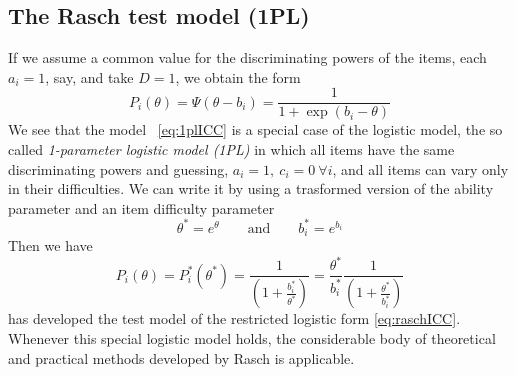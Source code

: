 \subsection{The Rasch test model (1PL)}
If we assume a common value for the discriminating powers of the items, each $a_i = 1$, say, and take $D = 1$, we obtain the form
\begin{equation} \label{eq:1plICC}
P_i(\theta)=\Psi(\theta-b_i)=\frac{1}{1+\exp(b_i-\theta)} 
\end{equation}
 We see that the model ~\ref{eq:1plICC} is a special case of the logistic model, the so called \textit{1-parameter logistic model (1PL)} in which all items have the same discriminating powers and guessing, $a_i=1, \ c_i=0 \ \forall i$, and all items can vary only in their difficulties.
We can write it by using a trasformed version of the ability parameter and an item difficulty parameter
\begin{equation}
\theta^{*}=e^\theta \qquad \text{and} \qquad b^{*}_i=e^{b_i }
\end{equation}
Then we have
\begin{equation}\label{eq:raschICC}
P_i(\theta)=P_i^*(\theta^*)=\frac{1}{\left( 1+ \frac{b_i^*}{\theta^*}\right)}=\frac{\theta^*}{b_i^*}\frac{1}{\left( 1+ \frac{\theta^*}{b_i^*} \right)} 
\end{equation}
\cite{Rasch1960} has developed the test model of the restricted logistic form \ref{eq:raschICC}. Whenever this special logistic model holds, the considerable body of theoretical and practical methods developed by Rasch is applicable.
